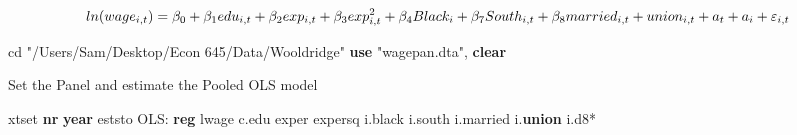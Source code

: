 \documentclass[
]{book}
\newenvironment{Shaded}{\begin{snugshade}}{\end{snugshade}}
\newcommand{\BaseNTok}[1]{\textcolor[rgb]{0.00,0.00,0.81}{#1}}
\newcommand{\FunctionTok}[1]{\textcolor[rgb]{0.13,0.29,0.53}{\textbf{#1}}}
\newcommand{\KeywordTok}[1]{\textcolor[rgb]{0.13,0.29,0.53}{\textbf{#1}}}
\newcommand{\NormalTok}[1]{#1}
\newcommand{\StringTok}[1]{\textcolor[rgb]{0.31,0.60,0.02}{#1}}
\begin{document}
\[ ln(wage_{i,t}) = \beta_0 + \beta_1 edu_{i,t} + \beta_2 exp_{i,t} + \beta_3 exp^2_{i,t} + \beta_4 Black_{i} + \beta_7 South_{i,t} \\ + \beta_8 married_{i,t} + union_{i,t} + a_t + a_i + \varepsilon_{i,t} \]

\begin{Shaded}
\begin{Highlighting}[]
\NormalTok{cd }\StringTok{"/Users/Sam/Desktop/Econ 645/Data/Wooldridge"}
\KeywordTok{use} \StringTok{"wagepan.dta"}\NormalTok{, }\KeywordTok{clear}
\end{Highlighting}
\end{Shaded}

Set the Panel and estimate the Pooled OLS model

\begin{Shaded}
\begin{Highlighting}[]
\NormalTok{xtset }\KeywordTok{nr} \FunctionTok{year}
\NormalTok{eststo OLS: }\KeywordTok{reg}\NormalTok{ lwage c.edu exper expersq i.}\BaseNTok{black}\NormalTok{ i.south i.married i.}\KeywordTok{union}\NormalTok{ i.d8*}
\end{Highlighting}
\end{Shaded}
\end{document}
